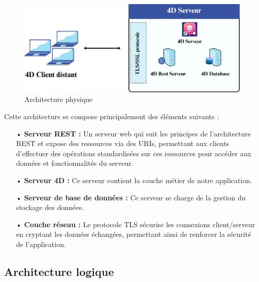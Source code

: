 \begin{figure}[htbp]
   \centering
   \includegraphics[scale=0.4]{Images/physique.jpg} %
   \caption{Architecture physique}
   \label{fig:physiqueArch}
\end{figure}

Cette architecture se compose principalement des éléments suivants :
\begin{itemize}
   \item[•] \textbf{Serveur REST :} Un serveur web qui suit les principes de l’architecture REST et expose des ressources via des URIs, permettant aux clients d’effectuer des opérations standardisées sur ces ressources pour accéder aux données et fonctionnalités du serveur.
   \item[•] \textbf{Serveur 4D :} Ce serveur contient la couche métier de notre application.
   \item[•] \textbf{Serveur de base de données :} Ce serveur se charge de la gestion du stockage des données.
   \item[•] \textbf{Couche réseau :} Le protocole TLS sécurise les connexions client/serveur en cryptant les données échangées, permettant ainsi de renforcer la sécurité de l'application.
\end{itemize}

\subsection{Architecture logique}

